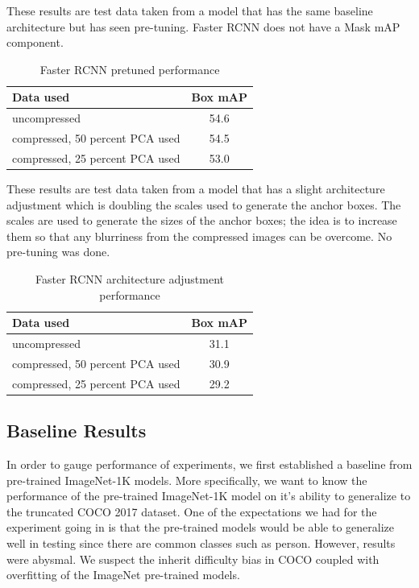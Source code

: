 \documentclass[10pt,twocolumn,letterpaper]{article}
\begin{document}
These results are test data taken from a model that has the same baseline architecture but has seen pre-tuning. Faster RCNN does not have a Mask mAP component. 

\begin{table}[hbt!]
\begin{center}
\begin{tabular}{|l|c|}
\hline
Data used   & Box mAP \\
\hline\hline
uncompressed & 54.6 \\
compressed, 50 percent PCA used & 54.5 \\
compressed, 25 percent PCA used & 53.0 \\
\hline
\end{tabular}
\end{center}
\caption{Faster RCNN pretuned performance}
\end{table}

These results are test data taken from a model that has a slight architecture adjustment which is doubling the scales used to generate the anchor boxes. The scales are used to generate the sizes of the anchor boxes; the idea is to increase them so that any blurriness from the compressed images can be overcome. No pre-tuning was done. 

\begin{table}[hbt!]
\begin{center}
\begin{tabular}{|l|c|}
\hline
Data used   & Box mAP \\
\hline\hline
uncompressed & 31.1 \\
compressed, 50 percent PCA used & 30.9 \\
compressed, 25 percent PCA used & 29.2 \\
\hline
\end{tabular}
\end{center}
\caption{Faster RCNN architecture adjustment performance}
\end{table}
\subsection{Baseline Results}

In order to gauge performance of experiments, we first established a baseline from pre-trained ImageNet-1K models. More specifically, we want to know the performance of the pre-trained ImageNet-1K model on it's ability to generalize to the truncated COCO 2017 dataset. One of the expectations we had for the experiment going in is that the pre-trained models would be able to generalize well in testing since there are common classes such as person. However, results were abysmal. We suspect the inherit difficulty bias in COCO coupled with overfitting of the ImageNet pre-trained models.
\end{document}
